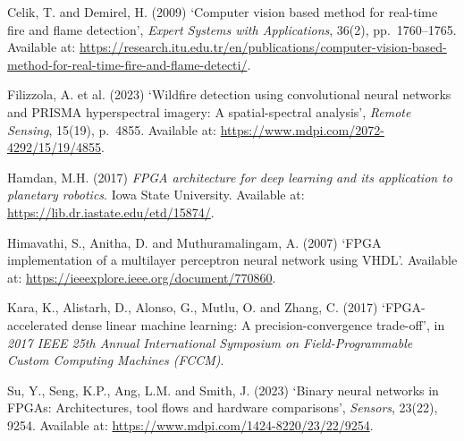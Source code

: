 \documentclass[11pt,a4paper]{article}
\begin{document}
Celik, T. and Demirel, H. (2009) `Computer vision based method for real-time fire and flame detection', \textit{Expert Systems with Applications}, 36(2), pp.~1760--1765. Available at: \url{https://research.itu.edu.tr/en/publications/computer-vision-based-method-for-real-time-fire-and-flame-detecti/}.

Filizzola, A. et al. (2023) `Wildfire detection using convolutional neural networks and PRISMA hyperspectral imagery: A spatial-spectral analysis', \textit{Remote Sensing}, 15(19), p.~4855. Available at: \url{https://www.mdpi.com/2072-4292/15/19/4855}.

Hamdan, M.H. (2017) \textit{FPGA architecture for deep learning and its application to planetary robotics}. Iowa State University. Available at: \url{https://lib.dr.iastate.edu/etd/15874/}.

Himavathi, S., Anitha, D. and Muthuramalingam, A. (2007) `FPGA implementation of a multilayer perceptron neural network using VHDL'. Available at: \url{https://ieeexplore.ieee.org/document/770860}.

Kara, K., Alistarh, D., Alonso, G., Mutlu, O. and Zhang, C. (2017) `FPGA-accelerated dense linear machine learning: A precision-convergence trade-off', in \textit{2017 IEEE 25th Annual International Symposium on Field-Programmable Custom Computing Machines (FCCM)}.

Su, Y., Seng, K.P., Ang, L.M. and Smith, J. (2023) `Binary neural networks in FPGAs: Architectures, tool flows and hardware comparisons', \textit{Sensors}, 23(22), 9254. Available at: \url{https://www.mdpi.com/1424-8220/23/22/9254}.
\end{document}
